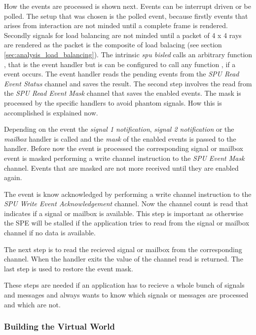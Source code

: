 \documentclass[DIV10, abstracton, openright, footsepline, headsepline, twoside, 9pt,
bigheadings]{scrreprt}
\begin{document}
How the events are processed is shown next. Events can be interrupt driven or be polled.
The setup that was chosen is the polled event, because firstly events that arises from
interaction are not minded until a complete frame is rendered. Secondly signals for load
balancing are not minded until a packet of 4 x 4 rays are rendered as the packet is the
composite of load balacing (see section \ref{sec:analysis_load_balancing}).
The intrinsic \textit{spu bisled} calls an arbitrary function , that is the event handler
but is can be configured to call any function , if a event occurs.
The event handler reads the pending events from the \textit{SPU Read Event Status} channel
and saves the result. The second step involves the read from the \textit{SPU Read Event Mask}
channel that saves the enabled events. The mask is processed by the specific handlers to
avoid phantom signals. How this is accomplished is explained now.

Depending on the event the \textit{signal 1 notification}, \textit{signal 2 notification} or
the \textit{mailbox} handler is called and the \textit{mask} of the enabled events is passed
to the handler. Before now the event is processed the corresponding signal or mailbox event
is masked performing a write channel instruction to the \textit{SPU Event Mask} channel.
 Events that are masked are not more received until they are enabled again.

The event is know acknowledged by performing a write channel instruction to the
\textit{SPU Write Event Acknowledgement} channel. Now the channel count is read that
indicates if a signal or mailbox is available. This step is important as otherwise
the SPE will be stalled if the application tries to read from the signal or mailbox
channel if no data is available.

The next step is to read the recieved signal or mailbox from the corresponding channel.
When the handler exits the value of the channel read is returned. The last step is used
to restore the event mask.

These steps are needed if an application has to recieve a whole bunch of signals and messages
and always wants to know which signals or messages are processed and which are not.

\subsubsection{Building the Virtual World}
\label{sec:impl_building_the_virtual_world}
\end{document}
